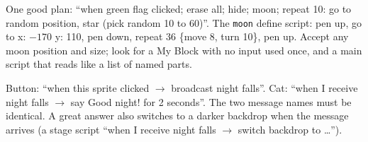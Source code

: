 \begin{answer}
One good plan: \enquote{when green flag clicked; erase all; hide; moon; repeat 10: go to random position, star (pick random 10 to 60)}. The \texttt{moon} define script: pen up, go to x: $-170$ y: 110, pen down, repeat 36 \{move 8, turn 10\}, pen up. Accept any moon position and size; look for a My Block with no input used once, and a main script that reads like a list of named parts.
\end{answer}

\begin{answer}
Button: \enquote{when this sprite clicked $\rightarrow$ broadcast night falls}. Cat: \enquote{when I receive night falls $\rightarrow$ say Good night! for 2 seconds}. The two message names must be identical. A great answer also switches to a darker backdrop when the message arrives (a stage script \enquote{when I receive night falls $\rightarrow$ switch backdrop to \ldots}).
\end{answer}
